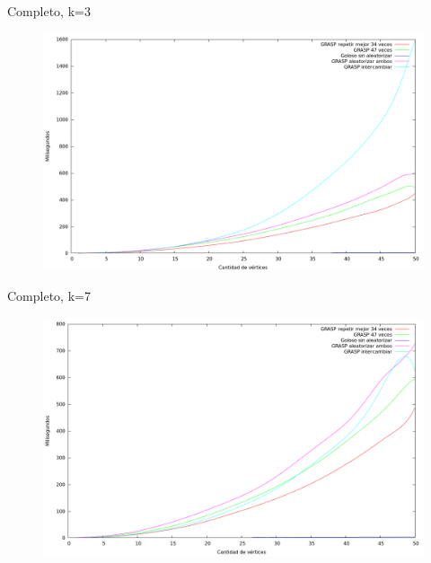 \vspace*{0.5cm}

Completo, k=3
\vspace*{0.5cm}

\begin{figure}[h]
  \begin{center}
    \includegraphics[scale=0.35]{imagenes/ej6-completo-k3-tiempo.png}
  \end{center}
\end{figure}

\vspace*{0.5cm}

Completo, k=7
\vspace*{0.5cm}

\begin{figure}[h]
  \begin{center}
    \includegraphics[scale=0.35]{imagenes/ej6-completo-k7-tiempo.png}
  \end{center}
\end{figure}

